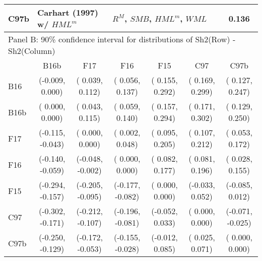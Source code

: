 \begin{table}[!ht]
\begin{tabular}{lcccccc}
  C97b  & \multicolumn{2}{l}{Carhart (1997) w/ $HML^m$}    & \multicolumn{3}{l}{$R^M$, $SMB$, $HML^m$, $WML$}               & 0.136 \\
  \midrule
  \multicolumn{7}{l}{Panel B: 90\% confidence interval for distributions of Sh2(Row) - Sh2(Column)} \\
        &        B16b      &        F17       &        F16       &        F15       &        C97       &        C97b      \\
  B16   & (-0.009,  0.000) & ( 0.039,  0.112) & ( 0.056,  0.137) & ( 0.155,  0.292) & ( 0.169,  0.299) & ( 0.127,  0.247) \\
  B16b  & ( 0.000,  0.000) & ( 0.043,  0.115) & ( 0.059,  0.140) & ( 0.157,  0.294) & ( 0.171,  0.302) & ( 0.129,  0.250) \\
  F17   & (-0.115, -0.043) & ( 0.000,  0.000) & ( 0.002,  0.048) & ( 0.095,  0.205) & ( 0.107,  0.212) & ( 0.053,  0.172) \\
  F16   & (-0.140, -0.059) & (-0.048, -0.002) & ( 0.000,  0.000) & ( 0.082,  0.177) & ( 0.081,  0.196) & ( 0.028,  0.155) \\
  F15   & (-0.294, -0.157) & (-0.205, -0.095) & (-0.177, -0.082) & ( 0.000,  0.000) & (-0.033,  0.052) & (-0.085,  0.012) \\
  C97   & (-0.302, -0.171) & (-0.212, -0.107) & (-0.196, -0.081) & (-0.052,  0.033) & ( 0.000,  0.000) & (-0.071, -0.025) \\
  C97b  & (-0.250, -0.129) & (-0.172, -0.053) & (-0.155, -0.028) & (-0.012,  0.085) & ( 0.025,  0.071) & ( 0.000,  0.000) \\
  \bottomrule
\end{tabular}
\label{tbl:bootstrap}
\end{table}
